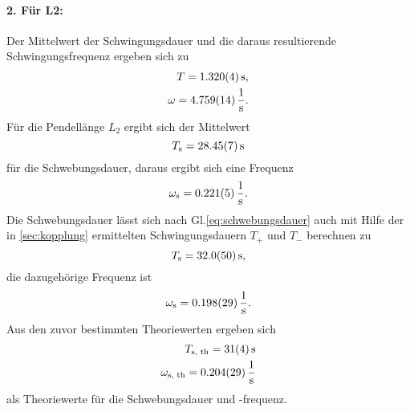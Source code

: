 \paragraph{2. Für L2: }
Der Mittelwert der Schwingungsdauer und die daraus resultierende Schwingungsfrequenz ergeben sich zu
\begin{align*}
    T = \SI{1.320 +- 0.004}{s}, \\
    \omega = \SI{4.759 +- 0.014}{\frac{1}{s}} .
\end{align*}
Für die Pendellänge $L_2$ ergibt sich der Mittelwert
\begin{equation*}
    T_\text{s} = \SI{28.45 +- 0.07}{s}
\end{equation*}
für die Schwebungsdauer, daraus ergibt sich eine Frequenz
\begin{equation*}
    \omega_\text{s} = \SI{0.221 +- 0.005}{\frac{1}{s}} .
\end{equation*}
Die Schwebungsdauer lässt sich nach Gl.\eqref{eq:schwebungsdauer} auch mit Hilfe der in \ref{sec:kopplung} ermittelten Schwingungsdauern $T_+$ und $T_-$ berechnen zu
\begin{equation*}
    T_\text{s} = \SI{32.0 +- 5.0}{s} ,
\end{equation*}
die dazugehörige Frequenz ist
\begin{equation*}
    \omega_\text{s} = \SI{0.198 +- 0.029}{\frac{1}{s}} .
\end{equation*}
Aus den zuvor bestimmten Theoriewerten ergeben sich
\begin{align*}
    T_\text{s, th} = \SI{31 +-4}{s} \\
    \omega_\text{s, th} = \SI{0.204 +- 0.029}{\frac{1}{s}} 
\end{align*}
als Theoriewerte für die Schwebungsdauer und -frequenz.